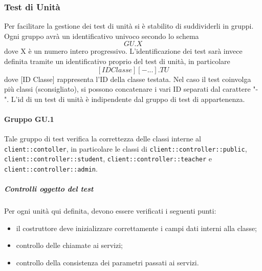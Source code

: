\documentclass[12pt,a4paper]{article}
\begin{document}
\subsubsection{Test di Unità}\label{test_unita}
Per facilitare la gestione dei test di unità si è stabilito di suddividerli in gruppi. Ogni gruppo avrà un identificativo univoco secondo lo schema
\[ GU.X  \]
dove X è un numero intero progressivo. 
L'identificazione dei test sarà invece definita tramite un identificativo proprio del test di unità, in particolare
\[ [ID Classe][- ...].TU \] 
dove [ID Classe] rappresenta l'ID della classe testata. Nel caso il test coinvolga più classi (sconsigliato), si possono concatenare i vari ID separati dal carattere "-".
L'id di un test di unità è indipendente dal gruppo di test di appartenenza.
\paragraph{Gruppo GU.1}
Tale gruppo di test verifica la correttezza delle classi interne al  \texttt{client::contoller}, in particolare le classi di \texttt{client::controller::public}, \texttt{client::controller::student}, \texttt{client::controller::teacher} e \texttt{client::controller::admin}.
\subparagraph{Controlli oggetto del test}
Per ogni unità  qui definita, devono essere verificati i seguenti punti:
\begin{itemize}
	\item il costruttore deve inizializzare correttamente i campi dati interni alla classe;
	\item controllo delle chiamate ai servizi;
	\item controllo della consistenza dei parametri passati ai servizi.
\end{itemize}
\end{document}
